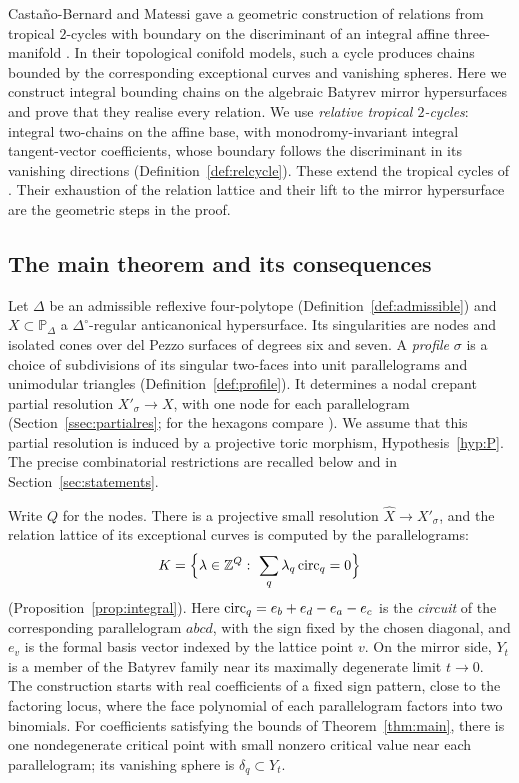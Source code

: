 Casta\~no-Bernard and Matessi gave a geometric construction of relations from tropical $2$-cycles with boundary on
the discriminant of an integral affine three-manifold \cite[Thm.~7.3, \S9.5]{CBM}. In their topological conifold models,
such a cycle produces chains bounded by the corresponding exceptional curves and vanishing spheres. Here we construct
integral bounding chains on the algebraic Batyrev mirror hypersurfaces and prove that they realise every relation.
We use \emph{relative tropical $2$-cycles}: integral two-chains on the affine base, with monodromy-invariant integral
tangent-vector coefficients, whose boundary follows the discriminant in its vanishing directions
(Definition~\ref{def:relcycle}). These extend the tropical cycles of \cite{CBM}. Their exhaustion of the relation
lattice and their lift to the mirror hypersurface are the geometric steps in the proof.

\subsection{The main theorem and its consequences}
Let $\Delta$ be an admissible reflexive four-polytope (Definition~\ref{def:admissible}) and
$X\subset\mathbb P_\Delta$ a $\Delta^\circ$-regular anticanonical hypersurface. Its singularities are nodes and isolated
cones over del Pezzo surfaces of degrees six and seven. A \emph{profile} $\sigma$ is a choice of subdivisions of its
singular two-faces into unit parallelograms and unimodular triangles (Definition~\ref{def:profile}). It determines a
nodal crepant partial resolution $X'_\sigma\to X$, with one node for each parallelogram (Section~\ref{ssec:partialres};
for the hexagons compare \cite[Prop.~3.7(2),(3)]{Paper5}).
We assume that this partial resolution is induced by a projective toric morphism, Hypothesis~\ref{hyp:P}.
The precise combinatorial restrictions are recalled below and in Section~\ref{sec:statements}.

Write $Q$ for the nodes. There is a projective small resolution $\widehat X\to X'_\sigma$, and the relation lattice
of its exceptional curves is computed by the parallelograms:
\[
K=\Bigl\{\lambda\in\Z^Q:\ \sum_q\lambda_q\,\circv_q=0\Bigr\}
\]
(Proposition~\ref{prop:integral}). Here $\mathrm{circ}_q=e_b+e_d-e_a-e_c$ is the \emph{circuit} of the corresponding
parallelogram $abcd$, with the sign fixed by the chosen diagonal, and $e_v$ is the formal basis vector indexed by
the lattice point $v$. On the mirror side, $Y_t$ is a member of the Batyrev family near its maximally degenerate
limit $t\to0$. The construction starts with real coefficients of a fixed sign pattern, close to the factoring locus, where
the face polynomial of each parallelogram factors into two binomials. For coefficients satisfying the bounds of
Theorem~\ref{thm:main}, there is one nondegenerate critical point with small nonzero critical value near each
parallelogram; its vanishing sphere is $\delta_q\subset Y_t$.

